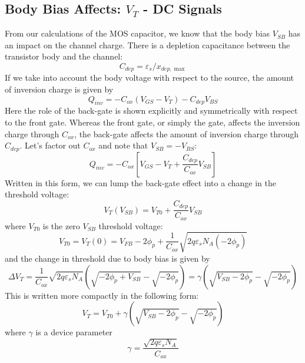 \subsection{Body Bias Affects: \texorpdfstring{$V_T$}{Threshold Voltage} - DC Signals}
From our calculations of the MOS capacitor, we know that the body bias $V_{SB}$ has an impact on the channel charge.  There is a depletion capacitance between the transistor body and the channel:
    \begin{equation}
        {C_{dep}} = {\varepsilon _s}/{x_{dep,\max }}
    \end{equation}
If we take into account the body voltage with respect to the source, the amount of inversion charge is given by
    \begin{equation}
        {Q_{inv}} =  - {C_{ox}}({V_{GS}} - {V_T}) - {C_{dep}}{V_{BS}}
    \end{equation}
Here the role of the back-gate is shown explicitly and symmetrically with respect to the front gate.  Whereas the front gate, or simply the gate, affects the inversion charge through $C_{ox}$, the back-gate affects the amount of inversion charge through $C_{dep}$.  
Let's factor out $C_{ox}$ and note that $V_{SB} = - V_{BS}$:
    \begin{equation}
        {Q_{inv}} =  - {C_{ox}}\left[ {{V_{GS}} - {V_T} + \frac{{{C_{dep}}}}{{{C_{ox}}}}{V_{SB}}} \right]
    \end{equation}
Written in this form, we can lump the back-gate effect into a change in the threshold voltage:
    \begin{equation}
        {V_T}({V_{SB}}) = {V_{T0}} + \frac{{{C_{dep}}}}{{{C_{ox}}}}{V_{SB}}
    \end{equation}
where $V_{T0}$ is the zero $V_{SB}$ threshold voltage:
    \begin{equation}
        {V_{T0}} = {V_T}(0) = {V_{FB}} - 2{\phi _p} + \frac{1}{{{C_{ox}}}}\sqrt {2q{\varepsilon _s}{N_A}( - 2{\phi _p})} 
    \end{equation}
and the change in threshold due to body bias is given by
    \begin{equation}
        \Delta {V_T} = \frac{1}{{{C_{ox}}}}\sqrt {2q{\varepsilon _s}{N_A}} \left(\sqrt { - 2{\phi _p} + {V_{SB}}}  - \sqrt { - 2{\phi _p}} \right) = \gamma \left( {\sqrt {{V_{SB}} - 2{\phi _p}}  - \sqrt { - 2{\phi _p}}}\right)
    \end{equation}
This is written more compactly in the following form:
    \begin{equation}
        {V_T} = {V_{T0}} + \gamma \left( {\sqrt {{V_{SB}} - 2{\phi _p}} - \sqrt {-2{\phi _p}}} \right)
        \label{eq:vtbias}
    \end{equation}
where $\gamma$ is a device parameter
    \begin{equation}
        \gamma = \frac{\sqrt{2q\varepsilon_s N_A}}{C_{ox}}
    \end{equation}
